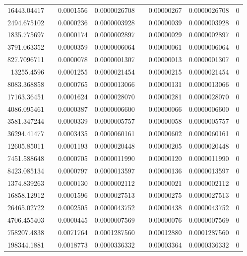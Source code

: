 \documentclass[
journal=jacsat, %
manuscript=article]{achemso}
\begin{document}
\begin{table}[htbp]
{\begin{tabular}{rrrrrrrr}
    16443.04417 &       & 0.0001556 & 0.0000026708 &       & 0.00000267 & 0.0000026708 & 0 \\
    2494.675102 &       & 0.0000236 & 0.0000003928 &       & 0.00000039 & 0.0000003928 & 0 \\
    1835.775697 &       & 0.0000174 & 0.0000002897 &       & 0.00000029 & 0.0000002897 & 0 \\
    3791.063352 &       & 0.0000359 & 0.0000006064 &       & 0.00000061 & 0.0000006064 & 0 \\
    827.7096711 &       & 0.0000078 & 0.0000001307 &       & 0.00000013 & 0.0000001307 & 0 \\
    13255.4596 &       & 0.0001255 & 0.0000021454 &       & 0.00000215 & 0.0000021454 & 0 \\
    8083.368858 &       & 0.0000765 & 0.0000013066 &       & 0.00000131 & 0.0000013066 & 0 \\
    17163.36451 &       & 0.0001624 & 0.0000028070 &       & 0.00000281 & 0.0000028070 & 0 \\
    4086.095461 &       & 0.0000387 & 0.0000006600 &       & 0.00000066 & 0.0000006600 & 0 \\
    3581.347244 &       & 0.0000339 & 0.0000005757 &       & 0.00000058 & 0.0000005757 & 0 \\
    36294.41477 &       & 0.0003435 & 0.0000060161 &       & 0.00000602 & 0.0000060161 & 0 \\
    12605.85011 &       & 0.0001193 & 0.0000020448 &       & 0.00000205 & 0.0000020448 & 0 \\
    7451.588648 &       & 0.0000705 & 0.0000011990 &       & 0.00000120 & 0.0000011990 & 0 \\
    8423.085134 &       & 0.0000797 & 0.0000013597 &       & 0.00000136 & 0.0000013597 & 0 \\
    1374.839263 &       & 0.0000130 & 0.0000002112 &       & 0.00000021 & 0.0000002112 & 0 \\
    16858.12912 &       & 0.0001596 & 0.0000027513 &       & 0.00000275 & 0.0000027513 & 0 \\
    26465.02722 &       & 0.0002505 & 0.0000043752 &       & 0.00000438 & 0.0000043752 & 0 \\
    4706.455403 &       & 0.0000445 & 0.0000007569 &       & 0.00000076 & 0.0000007569 & 0 \\
    758207.4838 &       & 0.0071764 & 0.0001287560 &       & 0.00012880 & 0.0001287560 & 0 \\
    198344.1881 &       & 0.0018773 & 0.0000336332 &       & 0.00003364 & 0.0000336332 & 0 \\

\end{tabular}}
\end{table}
\end{document}
